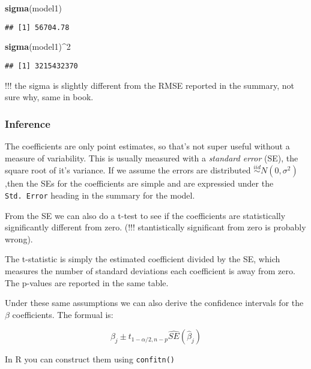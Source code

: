 \documentclass[]{article}
\newenvironment{Shaded}{\begin{snugshade}}{\end{snugshade}}
\newcommand{\DecValTok}[1]{\textcolor[rgb]{0.00,0.00,0.81}{#1}}
\newcommand{\KeywordTok}[1]{\textcolor[rgb]{0.13,0.29,0.53}{\textbf{#1}}}
\newcommand{\NormalTok}[1]{#1}
\newcommand{\OperatorTok}[1]{\textcolor[rgb]{0.81,0.36,0.00}{\textbf{#1}}}
\begin{document}
\begin{Shaded}
\begin{Highlighting}[]
\KeywordTok{sigma}\NormalTok{(model1)}
\end{Highlighting}
\end{Shaded}

\begin{verbatim}
## [1] 56704.78
\end{verbatim}

\begin{Shaded}
\begin{Highlighting}[]
\KeywordTok{sigma}\NormalTok{(model1)}\OperatorTok{\^{}}\DecValTok{2}
\end{Highlighting}
\end{Shaded}

\begin{verbatim}
## [1] 3215432370
\end{verbatim}

!!! the sigma is slightly different from the RMSE reported in the
summary, not sure why, same in book.

\hypertarget{inference}{%
\subsubsection{Inference}\label{inference}}

The coefficients are only point estimates, so that's not super useful
without a measure of variability. This is usually measured with a
\emph{standard error} (SE), the square root of it's variance. If we
assume the errors are distributed \(\stackrel{iid}{\sim}N(0, \sigma^2)\)
,then the SEs for the coefficients are simple and are expressied under
the \texttt{Std.\ Error} heading in the summary for the model.

From the SE we can also do a t-test to see if the coefficients are
statistically significantly different from zero. (!!! stantistically
significant from zero is probably wrong).

The t-statistic is simply the estimated coefficient divided by the SE,
which measures the number of standard deviations each coefficient is
away from zero. The p-values are reported in the same table.

Under these same assumptions we can also derive the confidence intervals
for the \(\beta\) coefficients. The formual is:

\[\beta_j \pm t_{1-α/2,n-p} \hat {SE}(\hat \beta_j)\]

In R you can construct them using \texttt{confitn()}
\end{document}
